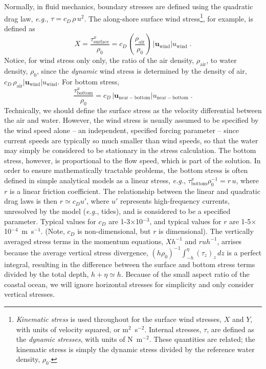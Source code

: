 \documentclass[11pt]{report}
\numberwithin{equation}{section}
\begin{document}
Normally, in fluid mechanics, boundary stresses are defined using the quadratic drag law, \emph{e.g.},  $\tau = c_D\,\rho\,u^2$.  The along-shore surface wind stress\footnote{{\it Kinematic stress} is used throughout for the surface wind stresses, $X$ and $Y$, with units of velocity squared, or m$^2$~s$^{-2}$.  Internal stresses, $\tau$, are defined as the {\it dynamic stresses}, with units of N~m$^{-2}$.  These quantities are related; the kinematic stress is simply the dynamic stress divided by the reference water density, $\rho_0$.}, for example, is defined as 
\begin{equation}
    X = \frac{\tau_{\mathrm{surface}}^{x}}{\rho_0} = c_D\, (\frac{\rho_{\mathrm{air}}} {\rho_0})\,|\mathbf{u}_{\mathrm{wind}}| u_{\mathrm{wind}} \; .
\end{equation}
Notice, for wind stress only only, the ratio of the air density, $\rho_{\mathrm{air}}$, to water density, $\rho_0$, since the \emph{dynamic} wind stress is determined by the density of air, $c_D\,\rho_{\mathrm{air}}|\mathbf{u}_{\mathrm{wind}}| u_{\mathrm{wind}}$.  For bottom stress,
\begin{equation}
    \frac{\tau_{\mathrm{bottom}}^{x}}{\rho_0} = c_D\, |\mathbf{u}_{\mathrm{near-bottom}}| u_{\mathrm{near-bottom}} \; .
\end{equation}
Technically, we should define the surface stress as the velocity differential between the air and water.  However, the wind stress is usually assumed to be specified by the wind speed alone --  an independent, specified forcing parameter -- since current speeds are typically so much smaller than wind speeds, so that the water may simply be considered to be stationary in the stress calculation.  The bottom stress, however, is proportional to the flow speed, which is part of the solution.  In order to ensure mathematically tractable problems, the bottom stress is often defined in simple analytical models as a linear stress, \emph{e.g.}, $\tau_{\mathrm{bottom}}^{x} \rho_0^{-1} = r\,u$, where $r$ is a linear friction coefficient.  The relationship between the linear and quadratic drag laws is then $r \simeq c_D u'$, where $u'$ represents high-frequency currents, unresolved by the model (\emph{e.g.}, tides), and is considered to be a specified parameter.  Typical values for $c_D$ are 1-3$\times$10$^{-3}$, and typical values for $r$ are 1-5$\times$10$^{-4}$~m~s$^{-1}$.  (Note, $c_D$ is non-dimensional, but $r$ is dimensional).  The vertically averaged stress terms in the momentum equations, $X h^{-1}$ and $r u h^{-1}$, arrises because the average vertical stress divergence, $(h \rho_0)^{-1} \int_{-h}^{\eta} (\tau_z)_z\,dz$ is a perfect integral, resulting in the difference between the surface and bottom stress terms divided by the total depth, $h+\eta \simeq h$.  Because of the small aspect ratio of the coastal ocean, we will ignore horizontal stresses for simplicity and only consider vertical stresses.
\end{document}
